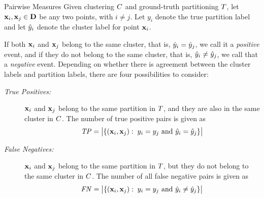 \begin{frame}{Pairwise Measures}
Given clustering ${\relax C}$ and ground-truth partitioning ${\relax T}$, let
$\mathbf{x}_i, \mathbf{x}_{j} \in \mathbf{D}$ be any two points, with $i\ne j$. 
Let $y_i$ denote
the true partition label and let $\hat{y}_i$ denote the cluster label for
point $\mathbf{x}_i$.

\medskip
If both $\mathbf{x}_i$ and $\mathbf{x}_{j}$ belong to the same cluster, that is, $\hat{y}_i =
\hat{y}_{j}$, we call it
a {\em positive} event, and if they do not belong to the same cluster,
that is, $\hat{y}_i \ne \hat{y}_{j}$, we call that a {\em negative} event.
Depending on whether there is agreement between the cluster labels and
partition labels, there are four possibilities to consider:

\begin{description}

\item[\textit{True Positives:}] 
  $\mathbf{x}_i$ and $\mathbf{x}_{j}$ belong to the same
  partition in ${\relax T}$, and they are also in the same cluster in ${\relax C}$. The number of true
  positive pairs is given as
  \begin{align*}
  \mathit{TP} = \bigl|\{(\mathbf{x}_i, \mathbf{x}_{j}):\; y_i = y_{j}
  \text{ and } \hat{y}_i = \hat{y}_{j} \}\bigr|
  \end{align*}

\item[\textit{False Negatives:}] 
  $\mathbf{x}_i$ and $\mathbf{x}_{j}$ belong to the same
  partition in ${\relax T}$, but they do not belong to the  same cluster in ${\relax C}$.
The
  number of all false negative pairs is given as
  \begin{align*}
  \mathit{FN} = \bigl|\{(\mathbf{x}_i, \mathbf{x}_{j}):\; y_i = y_{j}
  \text{ and } \hat{y}_i \ne \hat{y}_{j} \}\bigr|
  \end{align*}
\end{description}
\end{frame}

